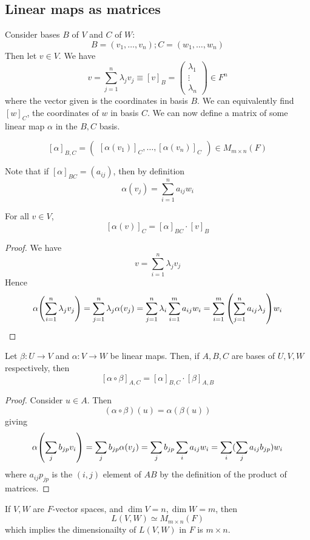 \subsection{Linear maps as matrices}
Consider bases \( B \) of \( V \) and \( C \) of \( W \):
\[
	B = (v_1, \dots, v_n); C = (w_1, \dots, w_n)
\]
Then let \( v \in V \).
We have
\[
	v = \sum_{j=1}^n \lambda_j v_j \equiv [v]_B = \begin{pmatrix}
		\lambda_1 \\ \vdots \\ \lambda_n
	\end{pmatrix} \in F^n
\]
where the vector given is the coordinates in basis \( B \).
We can equivalently find \( [w]_C \), the coordinates of \( w \) in basis \( C \).
We can now define a matrix of some linear map \( \alpha \) in the \( B, C \) basis.
\begin{definition}
	\[
		[\alpha]_{B,C} = \begin{pmatrix}
			[\alpha(v_1)]_C, \dots, [\alpha(v_n)]_C
		\end{pmatrix} \in M_{m\times n}(F)
	\]
\end{definition}
Note that if \( [\alpha]_{BC} = (a_{ij}) \), then by definition
\[
	\alpha (v_j) = \sum_{i=1}^n a_{ij} w_i
\]
\begin{lemma}
	For all \( v \in V \),
	\[
		[\alpha(v)]_C = [\alpha]_{BC} \cdot [v]_{B}
	\]
\end{lemma}
\begin{proof}
	We have
	\[
		v = \sum_{i=1}^n \lambda_j v_j
	\]
	Hence
	\[
		\alpha\qty(\sum_{i=1}^n \lambda_j v_j) = \sum_{j=1}^n \lambda_j \alpha(v_j) = \sum_{j=1}^n \lambda_i \sum_{i=1}^m a_{ij} w_i = \sum_{i=1}^m \qty( \sum_{j=1}^n a_{ij} \lambda_j ) w_i
	\]
\end{proof}
\begin{lemma}
	Let \( \beta \colon U \to V \) and \( \alpha \colon V \to W \) be linear maps.
	Then, if \( A,B,C \) are bases of \( U,V,W \) respectively, then
	\[
		[\alpha \circ \beta]_{A,C} = [\alpha]_{B,C} \cdot [\beta]_{A,B}
	\]
\end{lemma}
\begin{proof}
	Consider \( u \in A \).
	Then
	\[
		(\alpha \circ \beta)(u) = \alpha(\beta(u))
	\]
	giving
	\[
		\alpha\qty(\sum_j b_{jp} v_i) = \sum_j b_{jp} \alpha(v_j) = \sum_j b_{jp} \sum_i a_{ij} w_i = \sum_i ( \sum_j a_{ij} b_{jp} ) w_i
	\]
	where \( a_{ij} p_{jp} \) is the \( (i,j) \) element of \( AB \) by the definition of the product of matrices.
\end{proof}
\begin{proposition}
	If \( V, W \) are \( F \)-vector spaces, and \( \dim V = n, \dim W = m \), then
	\[
		L(V,W) \simeq M_{m \times n}(F)
	\]
	which implies the dimensionailty of \( L(V,W) \) in \( F \) is \( m \times n \).
\end{proposition}
